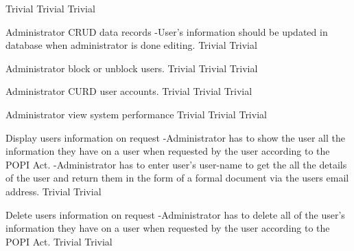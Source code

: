   	{Trivial}
	 	{Trivial}
  	{Trivial}
 
\FuncReq
    {Administrator CRUD data records}
		{-User's information should be updated in database when administrator is done editing.}
		{Trivial}
 		{Trivial}

\FuncReq
    {Administrator block or unblock users.}   
    {Trivial}
    {Trivial}
    {Trivial}
				
\FuncReq
    {Administrator CURD user accounts.}
    {Trivial}
    {Trivial}
 	 	{Trivial}

\FuncReq
    {Administrator view system performance}
    {Trivial}
    {Trivial}
    {Trivial}

\FuncReq
    {Display users information on request}
    {-Administrator has to show the user all the information they have on a user when requested by the user according to the POPI Act.
  	-Administrator has to enter user's user-name to get the all the details of the user and return them in the form of a formal document via the users email address.
    }
	{Trivial}
	{Trivial}

\FuncReq
  {Delete users information on request}
	{-Administrator has to delete all of the user's information they have on a user when requested by the user according to the POPI Act.}
	{Trivial}
	{Trivial}

